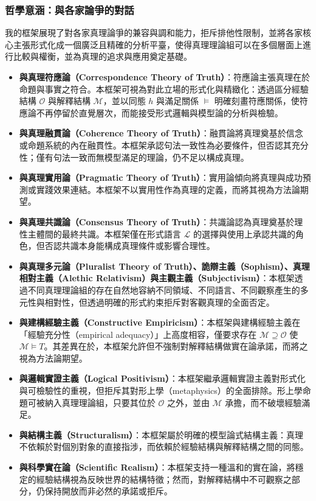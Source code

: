 \documentclass[a4paper,12pt]{article}
\begin{document}
\subsubsection{哲學意涵：與各家論爭的對話}
我的框架展現了對各家真理論爭的兼容與調和能力，拒斥排他性限制，並將各家核心主張形式化成一個廣泛且精確的分析平臺，使得真理理論組可以在多個層面上進行比較與權衡，並為真理的追求與應用奠定基礎。
\begin{itemize}
\item \textbf{與真理符應論（Correspondence Theory of Truth）}：符應論主張真理在於命題與事實之符合。本框架可視為對此立場的形式化與精緻化：透過區分經驗結構 $\mathcal{O}$ 與解釋結構 $\mathcal{M}$，並以同態 $h$ 與滿足關係 $\vDash$ 明確刻畫符應關係，使符應論不再停留於直覺層次，而能接受形式邏輯與模型論的分析與檢驗。
\item \textbf{與真理融貫論（Coherence Theory of Truth）}：融貫論將真理奠基於信念或命題系統的內在融貫性。本框架承認句法一致性為必要條件，但否認其充分性；僅有句法一致而無模型滿足的理論，仍不足以構成真理。
\item \textbf{與真理實用論（Pragmatic Theory of Truth）}：實用論傾向將真理與成功預測或實踐效果連結。本框架不以實用性作為真理的定義，而將其視為方法論期望。
\item \textbf{與真理共識論（Consensus Theory of Truth）}：共識論認為真理奠基於理性主體間的最終共識。本框架僅在形式語言 $\mathcal{L}$ 的選擇與使用上承認共識的角色，但否認共識本身能構成真理條件或影響合理性。
\item \textbf{與真理多元論（Pluralist Theory of Truth）、詭辯主義（Sophism）、真理相對主義（Alethic Relativism）與主觀主義（Subjectivism）}：本框架透過不同真理理論組的存在自然地容納不同領域、不同語言、不同觀察產生的多元性與相對性，但透過明確的形式約束拒斥對客觀真理的全面否定。
\item \textbf{與建構經驗主義（Constructive Empiricism）}：本框架與建構經驗主義在「經驗充分性（empirical adequacy）」上高度相容，僅要求存在 $\mathcal{M}\supseteq\mathcal{O}$ 使 $\mathcal{M}\vDash T$。其差異在於，本框架允許但不強制對解釋結構做實在論承諾，而將之視為方法論期望。
\item \textbf{與邏輯實證主義（Logical Positivism）}：本框架繼承邏輯實證主義對形式化與可檢驗性的重視，但拒斥其對形上學（metaphysics）的全面排除。形上學命題可被納入真理理論組，只要其位於 $\mathcal{O}$ 之外，並由 $\mathcal{M}$ 承擔，而不破壞經驗滿足。
\item \textbf{與結構主義（Structuralism）}：本框架屬於明確的模型論式結構主義：真理不依賴於對個別對象的直接指涉，而依賴於經驗結構與解釋結構之間的同態。
\item \textbf{與科學實在論（Scientific Realism）}：本框架支持一種溫和的實在論，將穩定的經驗結構視為反映世界的結構特徵；然而，對解釋結構中不可觀察之部分，仍保持開放而非必然的承諾或拒斥。

\end{itemize}
\end{document}
